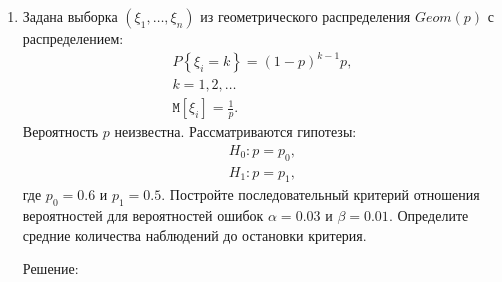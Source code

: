 \documentclass[a4paper,12pt]{article}
\newcommand{\expectation}[1]{\mathtt{M} \left[ #1 \right]}
\newcommand{\probability}[1]{P \left\{ #1 \right\}}
\begin{document}
\begin{enumerate}
\begin{gather*}
\begin{array}{l}
                  \end{array}
                  \right . \\
                  \sigma_1 n + \sigma_1 \sqrt{n} \Phi^{-1} (1 - \alpha) = \sigma_0 n + \sigma_0 \sqrt{n} \Phi^{-1}(\beta) , \\
                  \sigma_1 \sqrt{n} + \sigma_1 \Phi^{-1} (1 - \alpha) = \sigma_0 \sqrt{n} + \sigma_0 \Phi^{-1}(\beta) , \\
                  \sqrt{n}
                  = \frac{\sigma_1 \Phi^{-1} (1 - \alpha) - \sigma_0 \Phi^{-1}(\beta)}{\sigma_0 - \sigma_1}
                  \approx \frac{1 \cdot 2.326 - 2 \cdot (-1.645)}{2 - 1}
                  = 5.616, \\
                  n \approx 31.53 < 32, \\
                  \widetilde{h}
                  = \frac{\sqrt{n} \left( \Phi^{-1} (1 - \alpha) - \Phi^{-1}(\beta) \right)}{\sigma_0 - \sigma_1}
                  \approx \frac{5.616 (2.326 - (-1.645))}{2 - 1}
                  \approx 22.3 .
            \end{gather*}

      \item Задана выборка $\left( \xi_1, \dots, \xi_n \right)$ из геометрического распределения $Geom(p)$ с распределением:
            \begin{gather*}
                  \probability{\xi_i = k} = (1-p)^{k-1} p, \\
                  k = 1, 2, \dots \\
                  \expectation{\xi_i} = \frac{1}{p} .
            \end{gather*}
            Вероятность $p$ неизвестна. Рассматриваются гипотезы:
            \begin{gather*}
                  H_0: p = p_0 , \\
                  H_1: p = p_1 ,
            \end{gather*}
            где $p_0 = 0.6$ и $p_1 = 0.5$. Постройте последовательный критерий отношения вероятностей для вероятностей ошибок $\alpha = 0.03$
            и $\beta = 0.01$. Определите средние количества наблюдений до остановки критерия.

            Решение:


\end{enumerate}
\end{document}
